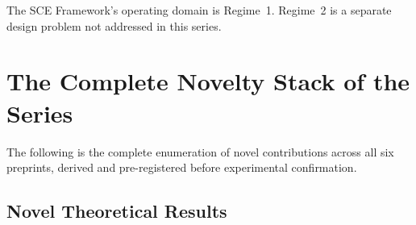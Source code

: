 \documentclass[11pt]{article}
\theoremstyle{plain}
\theoremstyle{definition}
\theoremstyle{remark}
\begin{document}
The SCE Framework's operating domain is Regime~1.  Regime~2 is
a separate design problem not addressed in this series.

\section{The Complete Novelty Stack of the Series}
\label{sec:novelty_stack}

The following is the complete enumeration of novel contributions
across all six preprints, derived and pre-registered before
experimental confirmation.

\subsection{Novel Theoretical Results}
\end{document}
